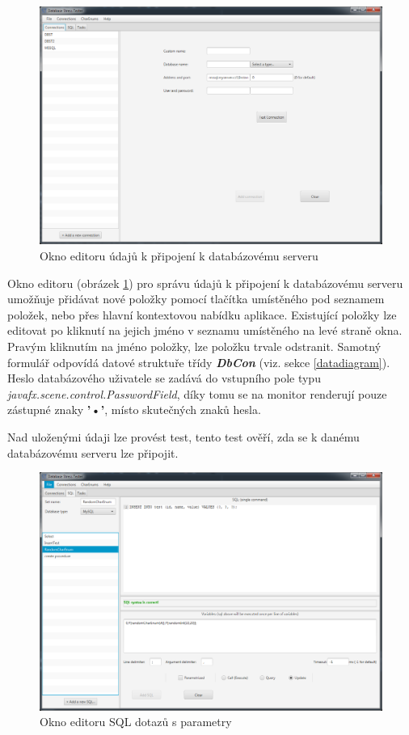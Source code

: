 \documentclass[czech,bachelor,public,dept460,male,cpdeclaration,twoside]{diploma}
\begin{document}
\newpage
\begin{figure}[!htbp]\centering\includegraphics[width=1.0\textwidth]{Figures/coneditor.png}\caption{Okno editoru údajů k připojení k databázovému serveru}\label{coneditor}
\end{figure}
Okno editoru (obrázek \ref{coneditor}) pro správu údajů k připojení k databázovému serveru umožňuje přidávat nové položky pomocí tlačítka umístěného pod seznamem položek, nebo přes hlavní kontextovou nabídku aplikace. Existující položky lze editovat po kliknutí na jejich jméno v seznamu umístěného na levé straně okna. Pravým kliknutím na jméno položky, lze položku trvale odstranit. Samotný formulář odpovídá datové struktuře třídy \textbf{\emph{DbCon}} (viz. sekce \ref{datadiagram}). Heslo databázového uživatele se zadává do vstupního pole typu \textit{javafx.scene.control.PasswordField}, díky tomu se na monitor renderují pouze zástupné znaky \textbf{'•'}, místo skutečných znaků hesla.

Nad uloženými údaji lze provést test, tento test ověří, zda se k danému databázovému serveru lze připojit.

\newpage
\begin{figure}[!htbp]\centering\includegraphics[width=1.0\textwidth]{Figures/sqleditor.png}\caption{Okno editoru SQL dotazů s parametry}
\end{figure}
\end{document}
